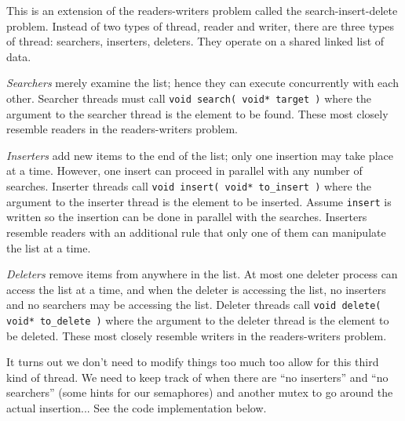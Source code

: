 This is an extension of the readers-writers problem called the search-insert-delete problem. Instead of two types of thread, reader and writer, there are three types of thread: searchers, inserters, deleters. They operate on a shared linked list of data. 

\textit{Searchers} merely examine the list; hence they can execute concurrently with each other. Searcher threads must call \texttt{void search( void* target )} where the argument to the searcher thread is the element to be found. These most closely resemble readers in the readers-writers problem. 

\textit{Inserters} add new items to the end of the list; only one insertion may take place at a time. However, one insert can proceed in parallel with any number of searches. Inserter threads call \texttt{void insert( void* to\_insert )} where the argument to the inserter thread is the element to be inserted. Assume \texttt{insert} is written so the insertion can be done in parallel with the searches. Inserters resemble readers with an additional rule that only one of them can manipulate the list at a time. 

\textit{Deleters} remove items from anywhere in the list. At most one deleter process can access the list at a time, and when the deleter is accessing the list, no inserters and no searchers may be accessing the list. Deleter threads call \texttt{void delete( void* to\_delete )} where the argument to the deleter thread is the element to be deleted. These most closely resemble writers in the readers-writers problem.

It turns out we don't need to modify things too much too allow for this third kind of thread. We need to keep track of when there are ``no inserters'' and ``no searchers'' (some hints for our semaphores) and another mutex to go around the actual insertion... See the code implementation below.

